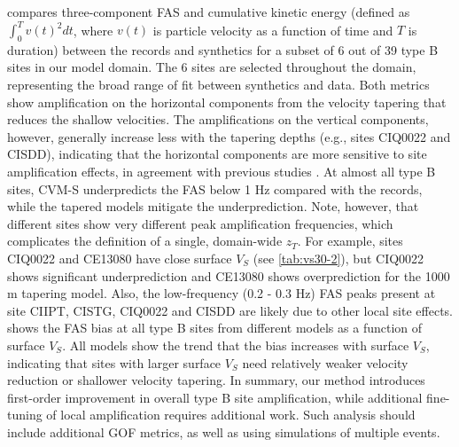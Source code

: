  compares three-component FAS and cumulative kinetic energy (defined as $\int_{0}^{T} v(t)^{2} d t$, where $v(t)$ is particle velocity as a function of time and $T$ is duration) between the records and synthetics for a subset of 6 out of 39 type B sites in our model domain. The 6 sites are selected throughout the domain, representing the broad range of fit between synthetics and data. Both metrics show amplification on the horizontal components from the velocity tapering that reduces the shallow velocities. The amplifications on the vertical components, however, generally increase less with the tapering depths (e.g., sites CIQ0022 and CISDD), indicating that the horizontal components are more sensitive to site amplification effects, in agreement with previous studies . At almost all type B sites, CVM-S underpredicts the FAS below 1 Hz compared with the records, while the tapered models mitigate the underprediction. Note, however, that different sites show very different peak amplification frequencies, which complicates the definition of a single, domain-wide $z_T$. For example, sites CIQ0022 and CE13080 have close surface $V_S$ (see \cref{tab:vs30-2}), but CIQ0022 shows significant underprediction and CE13080 shows overprediction for the 1000 m tapering model. Also, the low-frequency (0.2 - 0.3 Hz) FAS peaks present at site CIIPT, CISTG, CIQ0022 and CISDD are likely due to other local site effects.  shows the FAS bias at all type B sites from different models as a function of surface $V_S$. All models show the trend that the bias increases with surface $V_S$, indicating that sites with larger surface $V_S$ need relatively weaker velocity reduction or shallower velocity tapering. In summary, our method introduces first-order improvement in overall type B site amplification, while additional fine-tuning of local amplification requires additional work. Such analysis should include additional GOF metrics, as well as using simulations of multiple events.


